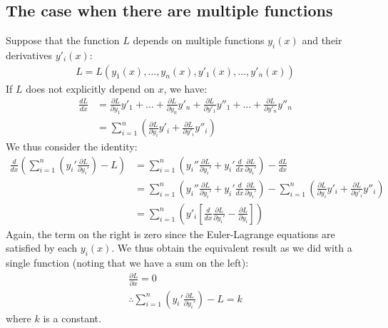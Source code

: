 \subsection{The case when there are multiple functions}
Suppose that the function $L$ depends on multiple functions $y_i(x)$ and their derivatives $y'_i(x)$:
\begin{align}
L=L(y_1(x),\dots, y_n(x),y'_1(x),\dots, y'_n(x))\nonumber
\end{align}
If $L$ does not explicitly depend on $x$, we have:
\begin{align}
\frac{dL}{dx}&=\frac{\partial L}{\partial y_1}y'_1+\dots +\frac{\partial L}{\partial y_n}y'_n+
\frac{\partial L}{\partial y'_1}y''_1+\dots +\frac{\partial L}{\partial y'_n}y''_n\nonumber\\
&=\sum_{i=1}^n\left(\frac{\partial L}{\partial y_i}y'_i+\frac{\partial L}{\partial y'_i}y''_i \right)
\end{align}
We thus consider the identity:
\begin{align}
\frac{d}{dx}\left(\sum_{i=1}^n\left( y_i'\frac{\partial L}{\partial y_i'}\right) -L \right)&=\sum_{i=1}^n\left( y_i''\frac{\partial L}{\partial y_i'}+y_i'\frac{d}{dx}\frac{\partial L}{\partial y_i'}\right)-\frac{dL}{dx}\nonumber\\
&=\sum_{i=1}^n\left( y_i''\frac{\partial L}{\partial y_i'}+y_i'\frac{d}{dx}\frac{\partial L}{\partial y_i'}\right)-\sum_{i=1}^n\left(\frac{\partial L}{\partial y_i}y'_i+\frac{\partial L}{\partial y'_i}y''_i \right)\nonumber\\
&=\sum_{i=1}^n\left(y'_i\left[\frac{d}{dx}\frac{\partial L}{\partial y_i'}- \frac{\partial L}{\partial y_i} \right]  \right)
\end{align}
Again, the term on the right is zero since the Euler-Lagrange equations are satisfied by each $y_i(x)$. We thus obtain the equivalent result as we did with a single function (noting that we have a sum on the left):
\begin{align}
\frac{\partial L}{\partial x}=0\nonumber\\
\therefore \sum_{i=1}^n\left( y_i'\frac{\partial L}{\partial y_i'}\right) -L=k
\label{eqn:varnoxm}
\end{align}
where $k$ is a constant.


